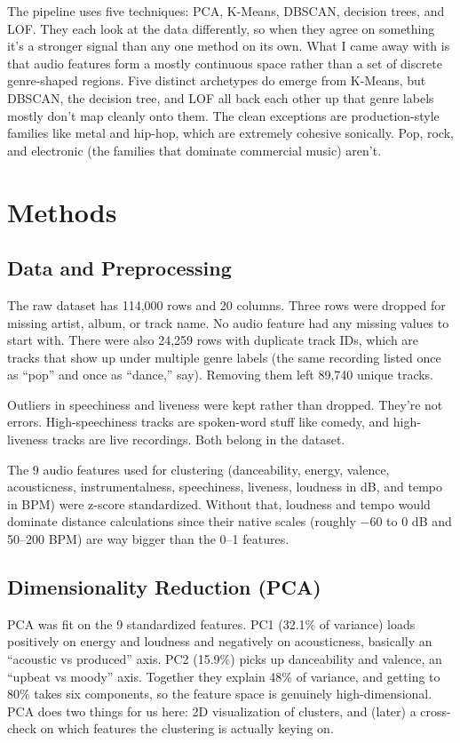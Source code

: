 \documentclass[10pt,twocolumn]{article}
\begin{document}
The pipeline uses five techniques: PCA, K-Means, DBSCAN, decision trees, and LOF. They each look at the data differently, so when they agree on something it's a stronger signal than any one method on its own. What I came away with is that audio features form a mostly continuous space rather than a set of discrete genre-shaped regions. Five distinct archetypes do emerge from K-Means, but DBSCAN, the decision tree, and LOF all back each other up that genre labels mostly don't map cleanly onto them. The clean exceptions are production-style families like metal and hip-hop, which are extremely cohesive sonically. Pop, rock, and electronic (the families that dominate commercial music) aren't.

\section{Methods}

\subsection{Data and Preprocessing}
The raw dataset has 114,000 rows and 20 columns. Three rows were dropped for missing artist, album, or track name. No audio feature had any missing values to start with. There were also 24,259 rows with duplicate track IDs, which are tracks that show up under multiple genre labels (the same recording listed once as ``pop'' and once as ``dance,'' say). Removing them left 89,740 unique tracks.

Outliers in speechiness and liveness were kept rather than dropped. They're not errors. High-speechiness tracks are spoken-word stuff like comedy, and high-liveness tracks are live recordings. Both belong in the dataset.

The 9 audio features used for clustering (danceability, energy, valence, acousticness, instrumentalness, speechiness, liveness, loudness in dB, and tempo in BPM) were z-score standardized. Without that, loudness and tempo would dominate distance calculations since their native scales (roughly $-60$ to $0$ dB and 50--200 BPM) are way bigger than the 0--1 features.

\subsection{Dimensionality Reduction (PCA)}
PCA was fit on the 9 standardized features. PC1 (32.1\% of variance) loads positively on energy and loudness and negatively on acousticness, basically an ``acoustic vs produced'' axis. PC2 (15.9\%) picks up danceability and valence, an ``upbeat vs moody'' axis. Together they explain 48\% of variance, and getting to 80\% takes six components, so the feature space is genuinely high-dimensional. PCA does two things for us here: 2D visualization of clusters, and (later) a cross-check on which features the clustering is actually keying on.
\end{document}
